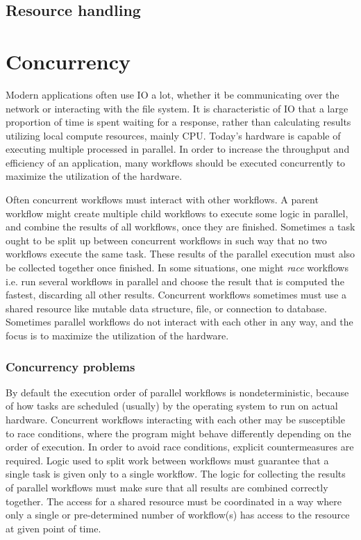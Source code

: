 \subsection{Resource handling} \label{zio:resource-handling}



\section{Concurrency}
Modern applications often use IO a lot, whether it be communicating over the network or interacting with the file system. It is characteristic of IO that a large proportion of time is spent waiting for a response, rather than calculating results utilizing local compute resources, mainly CPU. Today's hardware is capable of executing multiple processed in parallel. In order to increase the throughput and efficiency of an application, many workflows should be executed concurrently to maximize the utilization of the hardware.

Often concurrent workflows must interact with other workflows. A parent workflow might create multiple child workflows to execute some logic in parallel, and combine the results of all workflows, once they are finished. Sometimes a task ought to be split up between concurrent workflows in such way that no two workflows execute the same task. These results of the parallel execution must also be collected together once finished. In some situations, one might \textit{race} workflows i.e. run several workflows in parallel and choose the result that is computed the fastest, discarding all other results. Concurrent workflows sometimes must use a shared resource like mutable data structure, file, or connection to database. Sometimes parallel workflows do not interact with each other in any way, and the focus is to maximize the utilization of the hardware.


\subsubsection{Concurrency problems}
By default the execution order of parallel workflows is nondeterministic, because of how tasks are scheduled (usually) by the operating system to run on actual hardware. Concurrent workflows interacting with each other may be susceptible to race conditions, where the program might behave differently depending on the order of execution. In order to avoid race conditions, explicit countermeasures are required. Logic used to split work between workflows must guarantee that a single task is given only to a single workflow. The logic for collecting the results of parallel workflows must make sure that all results are combined correctly together. The access for a shared resource must be coordinated in a way where only a single or pre-determined number of workflow(s) has access to the resource at given point of time.


